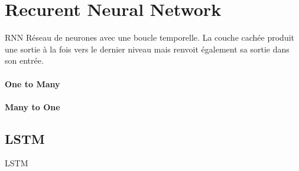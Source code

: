 \documentclass{report}
\begin{document}
	\section{Recurent Neural Network}
	
	\gls{RNN}
	Réseau de neurones avec une boucle temporelle.
	La couche cachée produit une sortie à la fois vers le dernier niveau mais renvoit également sa sortie dans son entrée.

	\paragraph{One to Many}

	\paragraph{Many to One}

	\subsection{LSTM}

	\gls{LSTM}

	\printglossaries
\end{document}
